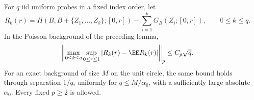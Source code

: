 \documentclass[11pt,letterpaper]{article}
\begin{document}
\begin{lemma}
\label{lem:ranked-prefix-remainder}
For $q$ iid uniform probes in a fixed index order, let
\[
 R_k(r)=H(B,B+\{Z_1,\ldots,Z_k\};[0,r])
                  -\sum_{i=1}^kG_B(Z_i;[0,r]),\qquad 0\le k\le q.
\]
In the Poisson background of the preceding lemma,
\begin{equation}\label{eq:ranked-prefix-remainder}
 \left\|\max_{0\le k\le q}\sup_{0\le r\le1}
                   |R_k(r)-\EE R_k(r)|\right\|_p\le C_p\sqrt q.
\end{equation}
For an exact background of size $M$ on the unit circle,
the same bound holds through separation $1/q$, uniformly
for $q\le M/\alpha_0$, with a sufficiently large absolute
$\alpha_0$. Every fixed $p\ge2$ is allowed.
\end{lemma}
\end{document}
